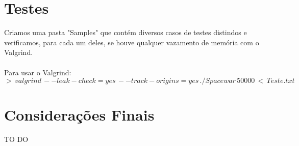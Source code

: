 \documentclass{article}
\begin{document}
\section{Testes}
Criamos uma pasta "Samples" que contém diversos casos de testes distindos e verificamos, para cada um deles, se houve qualquer vazamento de memória com o Valgrind. \\ \\
Para usar o Valgrind:
\\
\indent $>\,valgrind\,--leak-check=yes\,--track-origins=yes\,./Spacewar\,50000\,<\,Teste.txt$

\section{Considerações Finais}
TO DO
\end{document}
